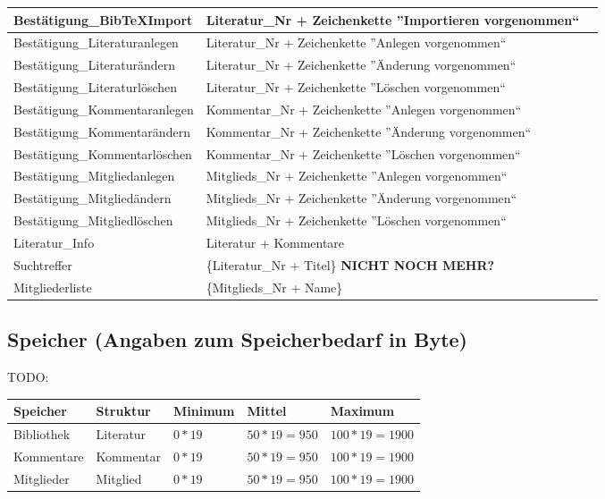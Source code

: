 \begin{longtable}{|l|p{6.0cm}|p{2cm}|}
Bestätigung\_BibTeXImport & Literatur\_Nr + Zeichenkette ''Importieren vorgenommen`` \\
\hline
Bestätigung\_Literaturanlegen & Literatur\_Nr + Zeichenkette ''Anlegen vorgenommen`` \\
\hline
Bestätigung\_Literaturändern & Literatur\_Nr + Zeichenkette ''Änderung vorgenommen`` \\
\hline
Bestätigung\_Literaturlöschen & Literatur\_Nr + Zeichenkette ''Löschen vorgenommen`` \\
\hline
Bestätigung\_Kommentaranlegen & Kommentar\_Nr + Zeichenkette ''Anlegen vorgenommen`` \\
\hline
Bestätigung\_Kommentarändern & Kommentar\_Nr + Zeichenkette ''Änderung vorgenommen`` \\
\hline
Bestätigung\_Kommentarlöschen & Kommentar\_Nr + Zeichenkette ''Löschen vorgenommen`` \\
\hline
Bestätigung\_Mitgliedanlegen & Mitglieds\_Nr + Zeichenkette ''Anlegen vorgenommen`` \\
\hline
Bestätigung\_Mitgliedändern & Mitglieds\_Nr + Zeichenkette ''Änderung vorgenommen`` \\
\hline
Bestätigung\_Mitgliedlöschen & Mitglieds\_Nr + Zeichenkette ''Löschen vorgenommen`` \\
\hline
Literatur\_Info & Literatur + Kommentare \\
\hline
Suchtreffer & \{Literatur\_Nr + Titel\} \textbf{NICHT NOCH MEHR?}\\
\hline
Mitgliederliste & \{Mitglieds\_Nr + Name\}\\
\hline
\end{longtable}

\subsection{Speicher (Angaben zum Speicherbedarf in Byte)}
TODO:\\
\begin{tabular}[ht]{|l|l|l|l|l|}
\hline
Speicher & Struktur & Minimum & Mittel & Maximum \\
\hline\hline
Bibliothek & {Literatur} & $0*19$ & $50*19=950$ & $100*19=1900$ \\
Kommentare & {Kommentar} & $0*19$ & $50*19=950$ & $100*19=1900$ \\
Mitglieder & {Mitglied}  & $0*19$ & $50*19=950$ & $100*19=1900$ \\
\hline
\end{tabular}

